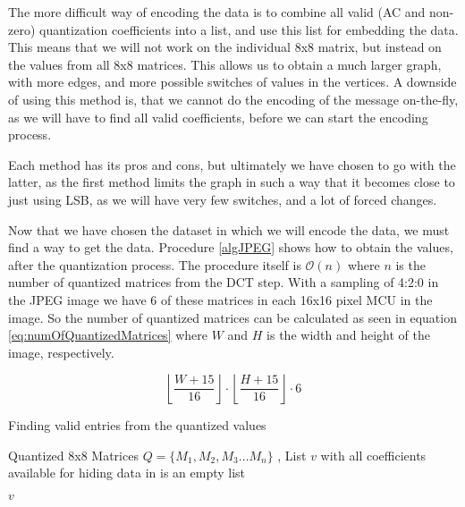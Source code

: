 The more difficult way of encoding the data is to combine all valid (AC and non-zero) quantization coefficients into a list, and use this list for embedding the data. This means that we will not work on the individual 8x8 matrix, but instead on the values from all 8x8 matrices. This allows us to obtain a much larger graph, with more edges, and more possible switches of values in the vertices. A downside of using this method is, that we cannot do the encoding of the message on-the-fly, as we will have to find all valid coefficients, before we can start the encoding process.

Each method has its pros and cons, but ultimately we have chosen to go with the latter, as the first method limits the graph in such a way that it becomes close to just using LSB, as we will have very few switches, and a lot of forced changes.

Now that we have chosen the dataset in which we will encode the data, we must find a way to get the data. Procedure \ref{algJPEG} shows how to obtain the values, after the quantization process. The procedure itself is $\mathcal{O}(n)$ where $n$ is the number of quantized matrices from the DCT step. With a sampling of 4:2:0 in the JPEG image we have 6 of these matrices in each 16x16 pixel MCU in the image. So the number of quantized matrices can be calculated as seen in equation \ref{eq:numOfQuantizedMatrices} where $W$ and $H$ is the width and height of the image, respectively.

\begin{equation}
\label{eq:numOfQuantizedMatrices}
\left \lfloor \frac{W + 15}{16}\right \rfloor \cdot \left \lfloor \frac{H + 15}{16}\right \rfloor \cdot 6
\end{equation}

\begin{algorithm}
\caption{Finding valid entries from the quantized values}
\label{algJPEG}
\begin{algorithmic}
\REQUIRE Quantized 8x8 Matrices $Q = \{ M_1, M_2, M_3 \ldots M_n \}$ ,
\ENSURE List $v$ with all coefficients available for hiding data in
 is an empty list

			\ENDIF
		\ENDFOR
	\ENDFOR
\ENDFOR

\RETURN $v$
\end{algorithmic}
\end{algorithm}

